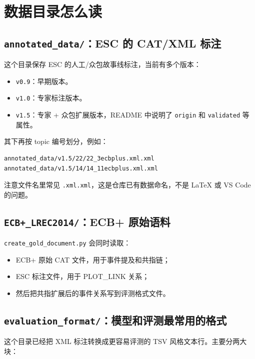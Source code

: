\documentclass[11pt,a4paper,fontset=fandol]{ctexart}
\newcommand{\code}[1]{\texttt{#1}}
\begin{document}
\section{数据目录怎么读}

\subsection{\code{annotated\_data/}：ESC 的 CAT/XML 标注}

这个目录保存 ESC 的人工/众包故事线标注，当前有多个版本：

\begin{itemize}[leftmargin=2em]
  \item \code{v0.9}：早期版本。
  \item \code{v1.0}：专家标注版本。
  \item \code{v1.5}：专家 + 众包扩展版本，README 中说明了 \code{origin} 和 \code{validated} 等属性。
\end{itemize}

其下再按 topic 编号划分，例如：

\begin{lstlisting}
annotated_data/v1.5/22/22_3ecbplus.xml.xml
annotated_data/v1.5/14/14_11ecbplus.xml.xml
\end{lstlisting}

注意文件名里常见 \code{.xml.xml}，这是仓库已有数据命名，不是 LaTeX 或 VS Code 的问题。

\subsection{\code{ECB+\_LREC2014/}：ECB+ 原始语料}

\code{create\_gold\_document.py} 会同时读取：

\begin{itemize}[leftmargin=2em]
  \item ECB+ 原始 CAT 文件，用于事件提及和共指链；
  \item ESC 标注文件，用于 PLOT\_LINK 关系；
  \item 然后把共指扩展后的事件关系写到评测格式文件。
\end{itemize}

\subsection{\code{evaluation\_format/}：模型和评测最常用的格式}

这个目录已经把 XML 标注转换成更容易评测的 TSV 风格文本行。主要分两大块：
\end{document}
